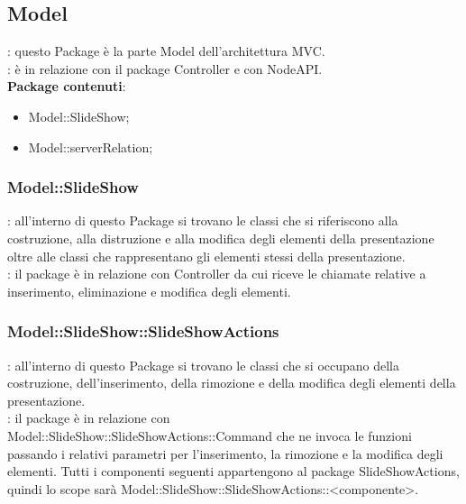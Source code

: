 \subsection{Model}{
	\textbf{\tipo}: questo Package è la parte Model dell'architettura MVC.\\
	\textbf{\relaz}: è in relazione con il package Controller e con NodeAPI.\\
	\textbf{Package contenuti}: 
	\begin{itemize}
	\item Model::\-SlideShow;
	\item Model::\-serverRelation;
	\end{itemize}
}
\subsubsection{Model::\-SlideShow}{
	\textbf{\tipo}: all’interno di questo Package si trovano le classi che si riferiscono alla costruzione, alla distruzione e alla modifica degli elementi della presentazione oltre alle classi che rappresentano gli elementi stessi della presentazione.\\
	\textbf{\relaz}: il package è in relazione con Controller da cui riceve le chiamate relative a inserimento, eliminazione e modifica degli elementi.
}
\subsubsection{Model::\-SlideShow::\-SlideShowActions}{
	\textbf{\tipo}: all’interno di questo Package si trovano le classi che si occupano della costruzione, dell'inserimento, della rimozione e della modifica degli elementi della presentazione.\\
	\textbf{\relaz}: il package è in relazione con\\ Model::\-SlideShow::\-SlideShowActions::\-Command che ne invoca le funzioni passando i relativi parametri per l'inserimento, la rimozione e la modifica degli elementi.
		Tutti i componenti seguenti appartengono al package SlideShowActions, quindi lo scope sarà Model::\-SlideShow::\-SlideShowActions::\-<componente>.
}
